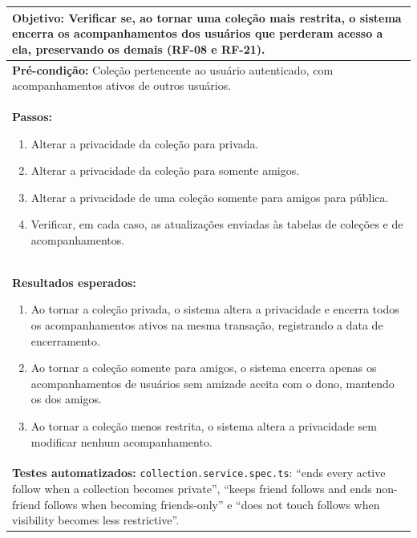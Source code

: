 \FloatBarrier
\begin{quadro}[h!]
\caption{Caso de teste CT03: validar o encerramento de acompanhamentos ao restringir a privacidade}
\label{quad:ct03}
\begin{tabular}{|p{\dimexpr\linewidth-2\tabcolsep-2\arrayrulewidth\relax}|}
\hline
\textbf{Objetivo:} Verificar se, ao tornar uma coleção mais restrita, o sistema encerra os acompanhamentos dos usuários que perderam acesso a ela, preservando os demais (RF-08 e RF-21). \\ \hline
\textbf{Pré-condição:} Coleção pertencente ao usuário autenticado, com acompanhamentos ativos de outros usuários. \\ \hline
\textbf{Passos:}
\begin{enumerate}[nosep,leftmargin=1.2em,topsep=2pt,partopsep=0pt,parsep=0pt,itemsep=1pt]
  \item Alterar a privacidade da coleção para privada.
  \item Alterar a privacidade da coleção para somente amigos.
  \item Alterar a privacidade de uma coleção somente para amigos para pública.
  \item Verificar, em cada caso, as atualizações enviadas às tabelas de coleções e de acompanhamentos.
\end{enumerate} \\ \hline
\textbf{Resultados esperados:}
\begin{enumerate}[nosep,leftmargin=1.2em,topsep=2pt,partopsep=0pt,parsep=0pt,itemsep=1pt]
  \item Ao tornar a coleção privada, o sistema altera a privacidade e encerra todos os acompanhamentos ativos na mesma transação, registrando a data de encerramento.
  \item Ao tornar a coleção somente para amigos, o sistema encerra apenas os acompanhamentos de usuários sem amizade aceita com o dono, mantendo os dos amigos.
  \item Ao tornar a coleção menos restrita, o sistema altera a privacidade sem modificar nenhum acompanhamento.
\end{enumerate} \\ \hline
\textbf{Testes automatizados:} \texttt{collection.service.spec.ts}: ``ends every active follow when a collection becomes private'', ``keeps friend follows and ends non-friend follows when becoming friends-only'' e ``does not touch follows when visibility becomes less restrictive''. \\ \hline
\end{tabular}
\end{quadro}

